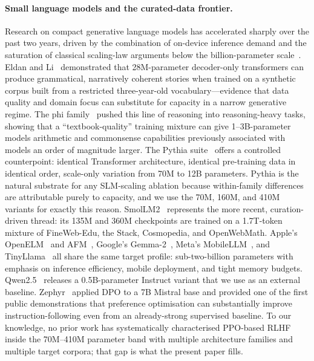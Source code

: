 \documentclass[10pt,twocolumn,letterpaper]{article}
\begin{document}
\paragraph{Small language models and the curated-data frontier.}
Research on compact generative language models has accelerated sharply over the past two years, driven by the combination of on-device inference demand and the saturation of classical scaling-law arguments below the billion-parameter scale~\cite{lu2024small}. Eldan and Li~\cite{eldan2023tinystories} demonstrated that 28M-parameter decoder-only transformers can produce grammatical, narratively coherent stories when trained on a synthetic corpus built from a restricted three-year-old vocabulary---evidence that data quality and domain focus can substitute for capacity in a narrow generative regime. The phi family~\cite{li2023textbooks,abdin2024phi3} pushed this line of reasoning into reasoning-heavy tasks, showing that a ``textbook-quality'' training mixture can give 1--3B-parameter models arithmetic and commonsense capabilities previously associated with models an order of magnitude larger. The Pythia suite~\cite{biderman2023pythia} offers a controlled counterpoint: identical Transformer architecture, identical pre-training data in identical order, scale-only variation from 70M to 12B parameters. Pythia is the natural substrate for any SLM-scaling ablation because within-family differences are attributable purely to capacity, and we use the 70M, 160M, and 410M variants for exactly this reason. SmolLM2~\cite{allal2025smollm2} represents the more recent, curation-driven thread: its 135M and 360M checkpoints are trained on a 1.7T-token mixture of FineWeb-Edu, the Stack, Cosmopedia, and OpenWebMath. Apple's OpenELM~\cite{mehta2024openelm} and AFM~\cite{gunter2024apple}, Google's Gemma-2~\cite{lee2024gemma}, Meta's MobileLLM~\cite{liu2024mobilellm}, and TinyLlama~\cite{zhang2024tinyllama} all share the same target profile: sub-two-billion parameters with emphasis on inference efficiency, mobile deployment, and tight memory budgets. Qwen2.5~\cite{qwen2025technical} releases a 0.5B-parameter Instruct variant that we use as an external baseline. Zephyr~\cite{tunstall2023zephyr} applied DPO to a 7B Mistral base and provided one of the first public demonstrations that preference optimisation can substantially improve instruction-following even from an already-strong supervised baseline. To our knowledge, no prior work has systematically characterised PPO-based RLHF inside the 70M--410M parameter band with multiple architecture families and multiple target corpora; that gap is what the present paper fills.
\end{document}
